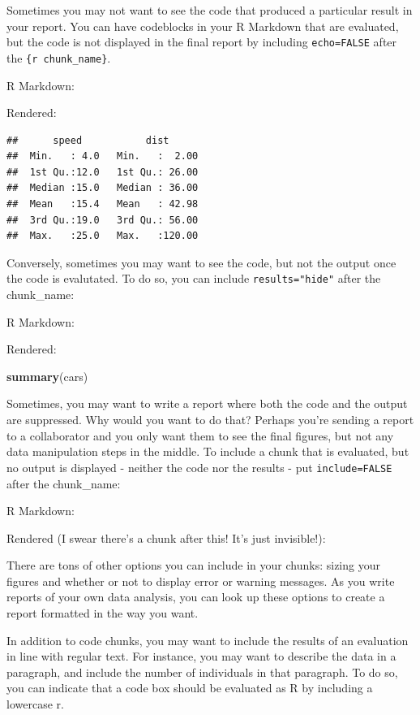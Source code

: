 \documentclass[
]{book}
\newenvironment{Shaded}{\begin{snugshade}}{\end{snugshade}}
\newcommand{\KeywordTok}[1]{\textcolor[rgb]{0.13,0.29,0.53}{\textbf{#1}}}
\newcommand{\NormalTok}[1]{#1}
\begin{document}
Sometimes you may not want to see the code that produced a particular result in your report. You can have codeblocks in your R Markdown that are evaluated, but the code is not displayed in the final report by including \texttt{echo=FALSE} after the \texttt{\{r\ chunk\_name\}}.

R Markdown:

Rendered:

\begin{verbatim}
##      speed           dist       
##  Min.   : 4.0   Min.   :  2.00  
##  1st Qu.:12.0   1st Qu.: 26.00  
##  Median :15.0   Median : 36.00  
##  Mean   :15.4   Mean   : 42.98  
##  3rd Qu.:19.0   3rd Qu.: 56.00  
##  Max.   :25.0   Max.   :120.00
\end{verbatim}

Conversely, sometimes you may want to see the code, but not the output once the code is evalutated. To do so, you can include \texttt{results="hide"} after the chunk\_name:

R Markdown:

Rendered:

\begin{Shaded}
\begin{Highlighting}[]
\KeywordTok{summary}\NormalTok{(cars)}
\end{Highlighting}
\end{Shaded}

Sometimes, you may want to write a report where both the code and the output are suppressed. Why would you want to do that? Perhaps you're sending a report to a collaborator and you only want them to see the final figures, but not any data manipulation steps in the middle. To include a chunk that is evaluated, but no output is displayed - neither the code nor the results - put \texttt{include=FALSE} after the chunk\_name:

R Markdown:

Rendered (I swear there's a chunk after this! It's just invisible!):

There are tons of other options you can include in your chunks: sizing your figures and whether or not to display error or warning messages. As you write reports of your own data analysis, you can look up these options to create a report formatted in the way you want.

In addition to code chunks, you may want to include the results of an evaluation in line with regular text. For instance, you may want to describe the data in a paragraph, and include the number of individuals in that paragraph. To do so, you can indicate that a code box should be evaluated as R by including a lowercase r.
\end{document}
